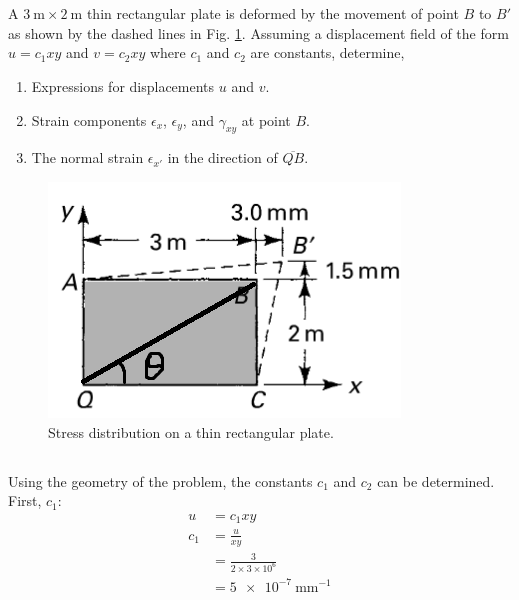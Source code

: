 \section{}


A $\qty{3}{\meter} \times \qty{2}{\meter}$ thin rectangular plate is deformed by the movement of point $B$ to $B'$ as shown by the dashed lines 
in Fig. \ref{fig:Q2}. Assuming a displacement field of the form $u = c_1xy$ and $v = c_2xy$ where $c_1$ and $c_2$ are constants, determine,

\begin{enumerate}[label=(\alph*)]
    \item Expressions for displacements $u$ and $v$.
    \item Strain components $\epsilon_x$, $\epsilon_y$, and $\gamma_{xy}$ at point $B$.
    \item The normal strain $\epsilon_{x'}$ in the direction of $\overline{QB}$.
\end{enumerate}


\begin{figure}[h]
    \centering
    \includegraphics[width=0.5\linewidth]{Questions/Figures/Q2ProblemDiagram.png}
    \caption{Stress distribution on a thin rectangular plate.}
    \label{fig:Q2}
\end{figure}

\subsection{}
Using the geometry of the problem, the constants $c_1$ and $c_2$ can be determined. First, $c_1$:
\begin{align*}
    u &= c_1xy \\
    c_1 &= \frac{u}{xy} \\
    &= \frac{3}{2\times3\times 10^{6}} \\
    &= \qty{5e-7}{\milli\meter^{-1}}
\end{align*}

